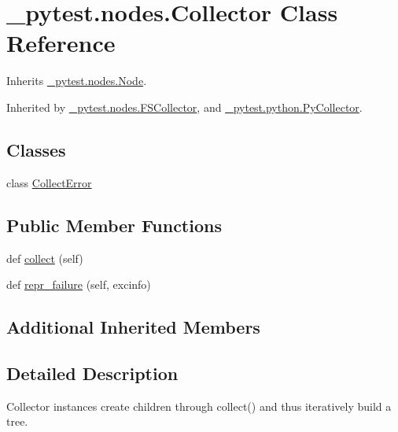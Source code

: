 \hypertarget{class__pytest_1_1nodes_1_1_collector}{}\section{\+\_\+pytest.\+nodes.\+Collector Class Reference}
\label{class__pytest_1_1nodes_1_1_collector}


Inherits \hyperlink{class__pytest_1_1nodes_1_1_node}{\+\_\+pytest.\+nodes.\+Node}.



Inherited by \hyperlink{class__pytest_1_1nodes_1_1_f_s_collector}{\+\_\+pytest.\+nodes.\+F\+S\+Collector}, and \hyperlink{class__pytest_1_1python_1_1_py_collector}{\+\_\+pytest.\+python.\+Py\+Collector}.

\subsection*{Classes}
\begin{DoxyCompactItemize}
\item 
class \hyperlink{class__pytest_1_1nodes_1_1_collector_1_1_collect_error}{Collect\+Error}
\end{DoxyCompactItemize}
\subsection*{Public Member Functions}
\begin{DoxyCompactItemize}
\item 
def \hyperlink{class__pytest_1_1nodes_1_1_collector_a2eb5899d8bd9caa8406114fab225d207}{collect} (self)
\item 
def \hyperlink{class__pytest_1_1nodes_1_1_collector_a198262bcafadc41fcaf8e60cee56eba6}{repr\+\_\+failure} (self, excinfo)
\end{DoxyCompactItemize}
\subsection*{Additional Inherited Members}


\subsection{Detailed Description}
\begin{DoxyVerb}Collector instances create children through collect()
    and thus iteratively build a tree.
\end{DoxyVerb}
 

